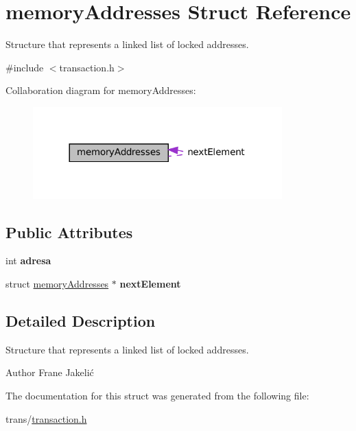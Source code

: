 \hypertarget{structmemoryAddresses}{}\section{memory\+Addresses Struct Reference}
\label{structmemoryAddresses}


Structure that represents a linked list of locked addresses.  




{\ttfamily \#include $<$transaction.\+h$>$}



Collaboration diagram for memory\+Addresses\+:\nopagebreak
\begin{figure}[H]
\begin{center}
\leavevmode
\includegraphics[width=272pt]{structmemoryAddresses__coll__graph}
\end{center}
\end{figure}
\subsection*{Public Attributes}
\begin{DoxyCompactItemize}
\item 
\mbox{\label{structmemoryAddresses_aec25a7082201140bdc5e4047d2280f5a}} 
int {\bfseries adresa}
\item 
\mbox{\label{structmemoryAddresses_a3500fd65745a7c7df644c3ac4efcff6c}} 
struct \hyperlink{structmemoryAddresses}{memory\+Addresses} $\ast$ {\bfseries next\+Element}
\end{DoxyCompactItemize}


\subsection{Detailed Description}
Structure that represents a linked list of locked addresses. 

\begin{DoxyAuthor}{Author}
Frane Jakelić 
\end{DoxyAuthor}


The documentation for this struct was generated from the following file\+:\begin{DoxyCompactItemize}
\item 
trans/\hyperlink{transaction_8h}{transaction.\+h}\end{DoxyCompactItemize}
